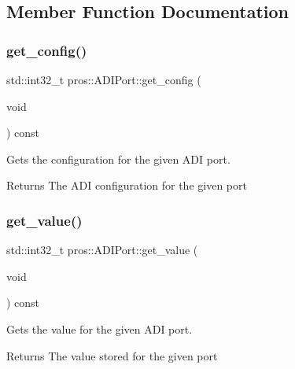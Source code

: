 \subsection{Member Function Documentation}
\mbox{\label{classpros_1_1ADIPort_a1227bc815b12d2789cb78f6d3dcaf37b}} 
\subsubsection{\texorpdfstring{get\+\_\+config()}{get\_config()}}
{\footnotesize\ttfamily std\+::int32\+\_\+t pros\+::\+A\+D\+I\+Port\+::get\+\_\+config (\begin{DoxyParamCaption}\item[{void}]{ }\end{DoxyParamCaption}) const}



Gets the configuration for the given A\+DI port. 

\begin{DoxyReturn}{Returns}
The A\+DI configuration for the given port 
\end{DoxyReturn}
\mbox{\label{classpros_1_1ADIPort_ac79b5fd3ce67ae6ffc4b1fbbb306e997}} 
\subsubsection{\texorpdfstring{get\+\_\+value()}{get\_value()}}
{\footnotesize\ttfamily std\+::int32\+\_\+t pros\+::\+A\+D\+I\+Port\+::get\+\_\+value (\begin{DoxyParamCaption}\item[{void}]{ }\end{DoxyParamCaption}) const}



Gets the value for the given A\+DI port. 

\begin{DoxyReturn}{Returns}
The value stored for the given port 
\end{DoxyReturn}
\mbox{\label{classpros_1_1ADIPort_abd86653eebbc34b863ace81839f7e40c}} 
